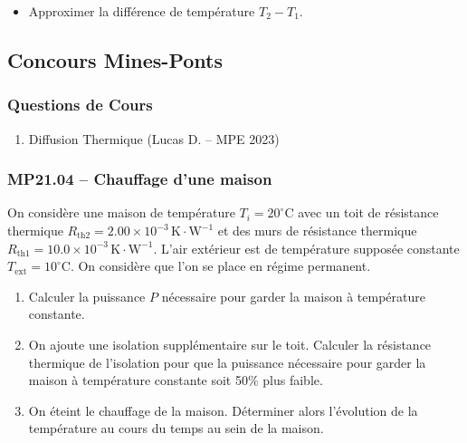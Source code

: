 \begin{itemize}[label=\textbullet]
\item Approximer la différence de température $T_{2} - T_{1}$.
\end{itemize}

\newpage
\subsection*{Concours Mines-Ponts}

\subsubsection*{Questions de Cours}
\begin{enumerate}
\item Diffusion Thermique (Lucas D. -- MPE 2023)
\end{enumerate}

\subsubsection*{MP21.04 -- Chauffage d'une maison  \lesdeux}

On considère une maison de température $T_{i} = 20^\circ\text{C}$ avec un toit de résistance thermique $R_{\text{th2}} = 2.00 \times 10^{-3}\,\text{K}\cdot\text{W}^{-1}$ et des murs de résistance thermique $R_{\text{th1}} = 10.0 \times 10^{-3}\,\text{K}\cdot\text{W}^{-1}$. L'air extérieur est de température supposée constante $T_{\text{ext}} = 10^\circ\text{C}$. On considère que l'on se place en régime permanent.

\begin{enumerate}
\item Calculer la puissance $P$ nécessaire pour garder la maison à température constante.
\item On ajoute une isolation supplémentaire sur le toit. Calculer la résistance thermique de l'isolation pour que la puissance nécessaire pour garder la maison à température constante soit 50\% plus faible.
\item On éteint le chauffage de la maison. Déterminer alors l'évolution de la température au cours du temps au sein de la maison.
\end{enumerate}

